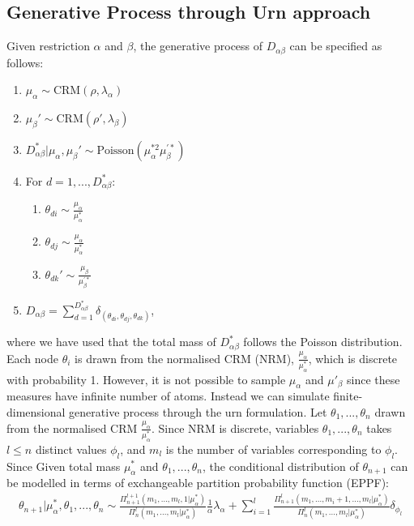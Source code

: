 \documentclass{article}
\begin{document}
\subsection{Generative Process through Urn approach}
Given restriction $\alpha$ and $\beta$, the generative process of $D_{\alpha\beta}$ can be specified as follows:
\begin{enumerate}
\item $\mu_\alpha \sim \text{CRM}(\rho, \lambda_\alpha)$
\item $\mu_\beta' \sim \text{CRM}(\rho', \lambda_\beta)$
\item $D_{\alpha\beta}^* | \mu_\alpha, \mu_\beta' \sim \text{Poisson}(\mu_\alpha^{*2}\mu_\beta^{'*})$
\item For $d=1,...,D_{\alpha\beta}^*$:
\begin{enumerate}
\item $\theta_{di} \sim \frac{\mu_\alpha}{\mu_\alpha^*}$
\item $\theta_{dj} \sim \frac{\mu_\alpha}{\mu_\alpha^*}$
\item $\theta_{dk}' \sim \frac{\mu_\beta}{\mu_\beta^{'*}}$
\end{enumerate}
\item $D_{\alpha\beta} = \sum_{d=1}^{D_{\alpha\beta}^*} \delta_{(\theta_{di}, \theta_{dj}, \theta_{dk})}$,
\end{enumerate}
where we have used that the total mass of $D_{\alpha\beta}^*$ follows the Poisson distribution. Each node $\theta_i$ is drawn from the normalised CRM (NRM), $\frac{\mu_\alpha}{\mu_\alpha^*}$, which is discrete with probability 1. However, it is not possible to sample $\mu_\alpha$ and $\mu'_\beta$ since these measures have infinite number of atoms. Instead we can simulate finite-dimensional generative process through the urn formulation. Let $\theta_1, ..., \theta_n$ drawn from the normalised CRM $\frac{\mu_\alpha}{\mu_\alpha^*}$. Since NRM is discrete, variables $\theta_1, ..., \theta_n$ takes $l \leq n$ distinct values $\phi_l$, and $m_l$ is the number of variables corresponding to $\phi_l$.
Since  Given total mass $\mu_\alpha^*$ and $\theta_1, ..., \theta_n$, the conditional distribution of $\theta_{n+1}$ can be modelled in terms of exchangeable partition probability function (EPPF):
\begin{align}
\label{eqn:eppf}
\theta_{n+1} | \mu_\alpha^*, \theta_1,...,\theta_n \sim \frac{\Pi_{n+1}^{l+1}(m_1, ..., m_l, 1 | \mu_\alpha^*)}{\Pi_{n}^{l}(m_1, ..., m_l | \mu_\alpha^*)} \frac{1}{\alpha} \lambda_\alpha
+ \sum_{i=1}^{l}\frac{\Pi_{n+1}^{l}(m_1, ..., m_{i}+1, ..., m_l | \mu_\alpha^*)}{\Pi_{n}^{l}(m_1, ..., m_l| \mu_\alpha^*)} \delta_{\phi_l}
\end{align}
\end{document}
